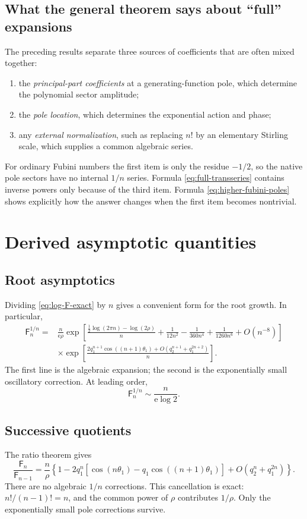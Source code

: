 \documentclass[11pt,a4paper,oneside]{article}
\theoremstyle{definition}
\theoremstyle{remark}
\newcommand{\Fub}{\mathsf{F}}
\newcommand{\e}{\mathrm{e}}
\begin{document}
\subsection{What the general theorem says about ``full'' expansions}
The preceding results separate three sources of coefficients that are often
mixed together:
\begin{enumerate}
 \item the \emph{principal-part coefficients} at a generating-function pole,
       which determine the polynomial sector amplitude;
 \item the \emph{pole location}, which determines the exponential action and
       phase;
 \item any \emph{external normalization}, such as replacing $n!$ by an
       elementary Stirling scale, which supplies a common algebraic series.
\end{enumerate}
For ordinary Fubini numbers the first item is only the residue $-1/2$, so the
native pole sectors have no internal $1/n$ series.  Formula
\cref{eq:full-transseries} contains inverse powers only because of the third
item.  Formula \cref{eq:higher-fubini-poles} shows explicitly how the answer
changes when the first item becomes nontrivial.

\section{Derived asymptotic quantities}\label{sec:derived}

\subsection{Root asymptotics}
Dividing \cref{eq:log-F-exact} by $n$ gives a convenient form for the root
growth.  In particular,
\begin{align}
 \Fub_n^{1/n}
 ={}&\frac{n}{\e\rho}
 \exp\!\left[
  \frac{\frac12\log(2\pi n)-\log(2\rho)}{n}
  +\frac{1}{12n^2}-\frac{1}{360n^4}+\frac{1}{1260n^6}
  +O(n^{-8})
 \right]\nonumber\\
 &\times
 \exp\!\left[
  \frac{2q_1^{n+1}\cos((n+1)\theta_1)+O(q_2^{n+1}+q_1^{2n+2})}{n}
 \right].
 \label{eq:nth-root}
\end{align}
The first line is the algebraic expansion; the second is the exponentially
small oscillatory correction.  At leading order,
\[
 \Fub_n^{1/n}\sim\frac{n}{\e\log2}.
\]

\subsection{Successive quotients}
The ratio theorem gives
\begin{equation}\label{eq:successive-quotient}
 \frac{\Fub_n}{\Fub_{n-1}}
 =\frac{n}{\rho}
 \left\{1-2q_1^n\left[
 \cos(n\theta_1)-q_1\cos((n+1)\theta_1)
 \right]+O(q_2^n+q_1^{2n})\right\}.
\end{equation}
There are no algebraic $1/n$ corrections.  This cancellation is exact:
$n!/(n-1)!=n$, and the common power of $\rho$ contributes $1/\rho$.
Only the exponentially small pole corrections survive.
\end{document}
